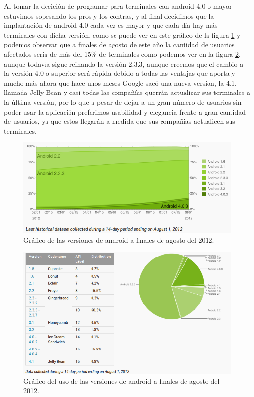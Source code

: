 Al tomar la decición de programar para terminales con android 4.0 o mayor estuvimos sopesando los pros y los contras, y al final decidimos que la implantación de android 4.0 cada vez es mayor y que cada día hay más terminales con dicha versión, como se puede ver en este gráfico de la figura \ref{fig:graficoEvolucionAndroid} y podemos observar que a finales de agosto de este año la cantidad de usuarios afectados sería de más del 15\% de terminales como podemos ver en la figura \ref{fig:graficoUsoAndroid}, aunque todavía sigue reinando la versión 2.3.3, aunque creemos que el cambio a la versión 4.0 o superior será rápida debido a todas las ventajas que aporta y mucho más ahora que hace unos meses Google sacó una nueva versíon, la 4.1, llamada Jelly Bean y casi todas las compañías querrán actualizar sus terminales a la última versión, por lo que a pesar de dejar a un gran número de usuarios sin poder usar la aplicación preferimos usabilidad y elegancia frente a gran cantidad de usuarios, ya que estos llegarán a medida que sus compañias actualicen sus terminales.


\begin{figure}
  \centering
    \includegraphics[scale=0.8]{./Introduccion/imagenes/graficoEvolucionAndroid.png}
  \caption{Gráfico de las versiones de android a finales de agosto del 2012.}
  \label{fig:graficoEvolucionAndroid}
\end{figure}

\begin{figure}
  \centering
    \includegraphics[scale=0.5]{./Introduccion/imagenes/graficoUsoAndroid.png}
  \caption{Gráfico del uso de las versiones de android a finales de agosto del 2012.}
  \label{fig:graficoUsoAndroid}
\end{figure}

